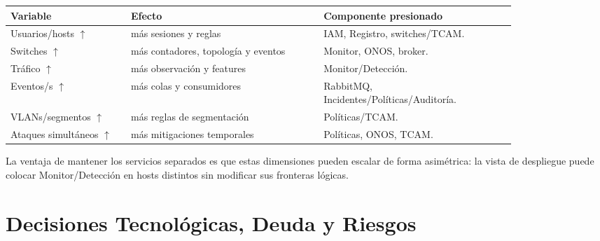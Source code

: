 \documentclass[11pt,a4paper]{report}
\begin{document}
\begin{longtable}{p{0.2\linewidth}p{0.32\linewidth}p{0.32\linewidth}}
\toprule
Variable & Efecto & Componente presionado \\
\midrule
Usuarios/hosts $\uparrow$ & más sesiones y reglas & IAM, Registro, switches/TCAM. \\
Switches $\uparrow$ & más contadores, topología y eventos & Monitor, ONOS, broker. \\
Tráfico $\uparrow$ & más observación y features & Monitor/Detección. \\
Eventos/s $\uparrow$ & más colas y consumidores & RabbitMQ, Incidentes/Políticas/Auditoría. \\
VLANs/segmentos $\uparrow$ & más reglas de segmentación & Políticas/TCAM. \\
Ataques simultáneos $\uparrow$ & más mitigaciones temporales & Políticas, ONOS, TCAM. \\
\bottomrule
\end{longtable}

La ventaja de mantener los servicios separados es que estas dimensiones pueden escalar de forma asimétrica: la vista de despliegue puede colocar Monitor/Detección en hosts distintos sin modificar sus fronteras lógicas.

\chapter{Decisiones Tecnológicas, Deuda y Riesgos}
\end{document}
